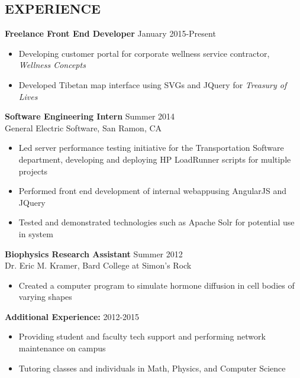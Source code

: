 \documentclass{res}
\begin{document}
\begin{resume}
\section{EXPERIENCE} 
{\bf Freelance Front End Developer} \hfill January 2015-Present
\begin{itemize}
\item Developing customer portal for corporate wellness service contractor, \textit{Wellness Concepts}
\item Developed Tibetan map interface using SVGs and JQuery for \textit{Treasury of Lives}
\end{itemize}
\vspace*{-\baselineskip}\leavevmode
{\bf Software Engineering Intern} \hfill Summer 2014\\
General Electric Software, San Ramon, CA
\begin{itemize}
\item Led server performance testing initiative for the Transportation Software department, developing and deploying HP LoadRunner scripts for multiple projects
\item Performed front end development of internal webappusing AngularJS and JQuery
\item Tested and demonstrated technologies such as Apache Solr for potential use in system
\end{itemize}
\vspace*{-\baselineskip}\leavevmode
{\bf Biophysics Research Assistant} \hfill Summer 2012\\
Dr. Eric M. Kramer, Bard College at Simon's Rock
\begin{itemize}
\item Created a computer program to simulate hormone diffusion in cell bodies of varying shapes
\end{itemize}
\vspace*{-\baselineskip}\leavevmode
{\bf Additional Experience:} \hfill 2012-2015
\begin{itemize}
\item Providing student and faculty tech support and performing network maintenance on campus
\item Tutoring classes and individuals in Math, Physics, and Computer Science
\end{itemize}
 

\end{resume}
\end{document}
